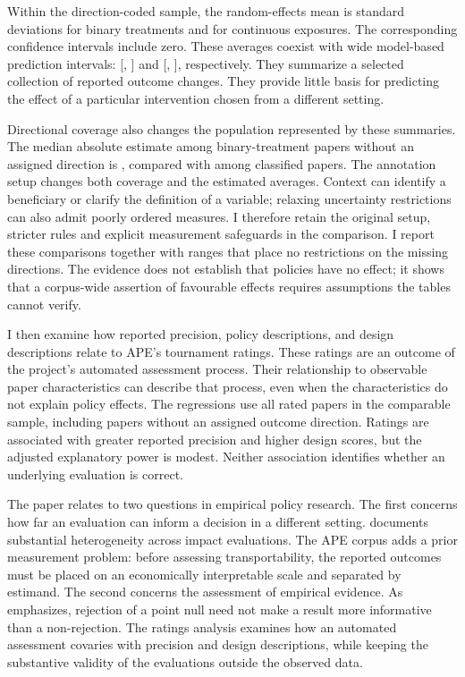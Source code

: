 \documentclass[11pt]{article}
\begin{document}
Within the direction-coded sample, the random-effects mean is \BinaryMean{} standard deviations for binary treatments and \ContinuousMean{} for continuous exposures. The corresponding confidence intervals include zero. These averages coexist with wide model-based prediction intervals: [\BinaryPiLo{}, \BinaryPiHi{}] and [\ContinuousPiLo{}, \ContinuousPiHi{}], respectively. They summarize a selected collection of reported outcome changes. They provide little basis for predicting the effect of a particular intervention chosen from a different setting.

Directional coverage also changes the population represented by these summaries. The median absolute estimate among binary-treatment papers without an assigned direction is \BinarySelectionAbs{}, compared with \BinaryOrientedAbs{} among classified papers. The annotation setup changes both coverage and the estimated averages. Context can identify a beneficiary or clarify the definition of a variable; relaxing uncertainty restrictions can also admit poorly ordered measures. I therefore retain the original setup, stricter rules and explicit measurement safeguards in the comparison. I report these comparisons together with ranges that place no restrictions on the missing directions. The evidence does not establish that policies have no effect; it shows that a corpus-wide assertion of favourable effects requires assumptions the tables cannot verify.

I then examine how reported precision, policy descriptions, and design descriptions relate to APE's tournament ratings. These ratings are an outcome of the project's automated assessment process. Their relationship to observable paper characteristics can describe that process, even when the characteristics do not explain policy effects. The regressions use all rated papers in the comparable sample, including papers without an assigned outcome direction. Ratings are associated with greater reported precision and higher design scores, but the adjusted explanatory power is modest. Neither association identifies whether an underlying evaluation is correct.

The paper relates to two questions in empirical policy research. The first concerns how far an evaluation can inform a decision in a different setting. \citet{vivalt} documents substantial heterogeneity across impact evaluations. The APE corpus adds a prior measurement problem: before assessing transportability, the reported outcomes must be placed on an economically interpretable scale and separated by estimand. The second concerns the assessment of empirical evidence. As \citet{abadie} emphasizes, rejection of a point null need not make a result more informative than a non-rejection. The ratings analysis examines how an automated assessment covaries with precision and design descriptions, while keeping the substantive validity of the evaluations outside the observed data.
\end{document}

